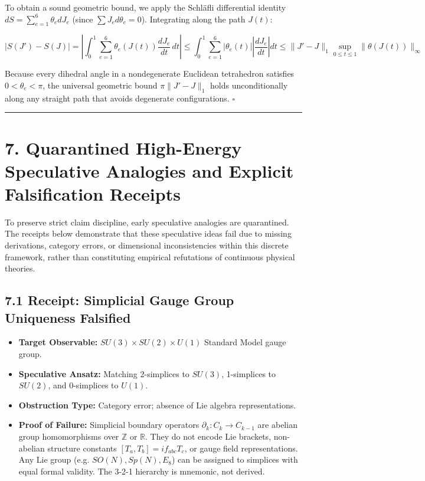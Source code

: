 \documentclass[11pt]{article}
\begin{document}
To obtain a sound geometric bound, we apply the Schläfli differential identity $dS = \sum_{e=1}^6 \theta_e dJ_e$ (since $\sum J_e d\theta_e = 0$). Integrating along the path $J(t)$:

\begin{equation*}
|S(J') - S(J)| = \left| \int_0^1 \sum_{e=1}^6 \theta_e(J(t)) \frac{dJ_e}{dt} \, dt \right| \le \int_0^1 \sum_{e=1}^6 |\theta_e(t)| \left| \frac{dJ_e}{dt} \right| dt \le \|J' - J\|_1 \sup_{0 \le t \le 1} \|\theta(J(t))\|_\infty
\end{equation*}

Because every dihedral angle in a nondegenerate Euclidean tetrahedron satisfies $0 < \theta_e < \pi$, the universal geometric bound $\pi \|J' - J\|_1$ holds unconditionally along any straight path that avoids degenerate configurations. $\square$

\medskip\hrule\medskip
\section{\texorpdfstring{7. Quarantined High-Energy Speculative Analogies and Explicit Falsification Receipts}{7. Quarantined High-Energy Speculative Analogies and Explicit Falsification Receipts}}

To preserve strict claim discipline, early speculative analogies are quarantined. The receipts below demonstrate that these speculative ideas fail due to missing derivations, category errors, or dimensional inconsistencies within this discrete framework, rather than constituting empirical refutations of continuous physical theories.

\subsection{\texorpdfstring{7.1 Receipt: Simplicial Gauge Group Uniqueness Falsified}{7.1 Receipt: Simplicial Gauge Group Uniqueness Falsified}}

\begin{itemize}[leftmargin=1.4em,itemsep=0.2em]
\item \textbf{Target Observable:} $SU(3) \times SU(2) \times U(1)$ Standard Model gauge group.
\item \textbf{Speculative Ansatz:} Matching 2-simplices to $SU(3)$, 1-simplices to $SU(2)$, and 0-simplices to $U(1)$.
\item \textbf{Obstruction Type:} Category error; absence of Lie algebra representations.
\item \textbf{Proof of Failure:} Simplicial boundary operators $\partial_k: C_k \to C_{k-1}$ are abelian group homomorphisms over $\mathbb{Z}$ or $\mathbb{R}$. They do not encode Lie brackets, non-abelian structure constants $[T_a, T_b] = i f_{abc} T_c$, or gauge field representations. Any Lie group (e.g. $SO(N), Sp(N), E_8$) can be assigned to simplices with equal formal validity. The 3-2-1 hierarchy is mnemonic, not derived.
\end{itemize}
\end{document}
